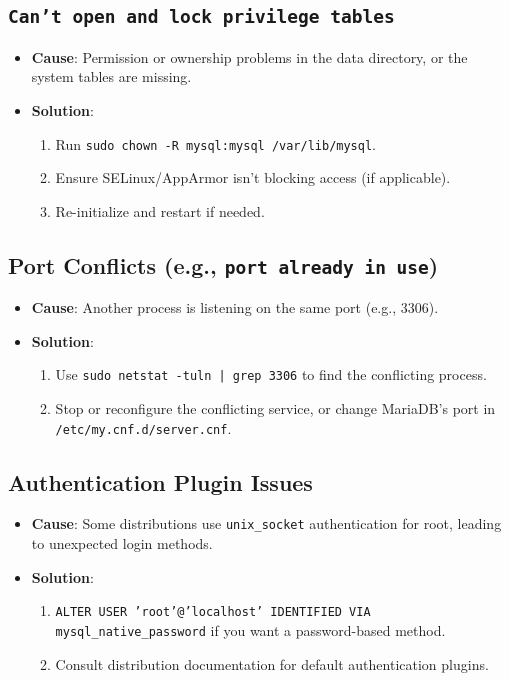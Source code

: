 \documentclass[10pt]{article}
\begin{document}
\subsection{\texttt{Can't open and lock privilege tables}}
\begin{itemize}
    \item \textbf{Cause}: Permission or ownership problems in the data directory, or the system tables are missing.
    \item \textbf{Solution}:
          \begin{enumerate}
              \item Run \texttt{sudo chown -R mysql:mysql /var/lib/mysql}.
              \item Ensure SELinux/AppArmor isn’t blocking access (if applicable).
              \item Re-initialize and restart if needed.
          \end{enumerate}
\end{itemize}

\subsection{Port Conflicts (e.g., \texttt{port already in use})}
\begin{itemize}
    \item \textbf{Cause}: Another process is listening on the same port (e.g., 3306).
    \item \textbf{Solution}:
          \begin{enumerate}
              \item Use \texttt{sudo netstat -tuln | grep 3306} to find the conflicting process.
              \item Stop or reconfigure the conflicting service, or change MariaDB’s port in \texttt{/etc/my.cnf.d/server.cnf}.
          \end{enumerate}
\end{itemize}

\subsection{Authentication Plugin Issues}
\begin{itemize}
    \item \textbf{Cause}: Some distributions use \texttt{unix\_socket} authentication for root, leading to unexpected login methods.
    \item \textbf{Solution}:
          \begin{enumerate}
              \item \texttt{ALTER USER 'root'@'localhost' IDENTIFIED VIA mysql\_native\_password} if you want a password-based method.
              \item Consult distribution documentation for default authentication plugins.
          \end{enumerate}
\end{itemize}
\end{document}

